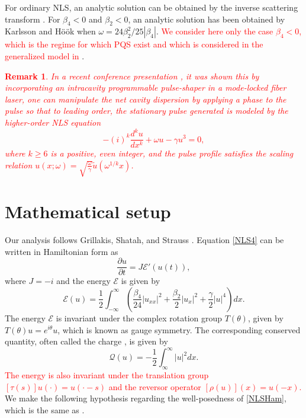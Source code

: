 \documentclass[12pt]{elsarticle}
\def\calE{{\mathcal E}}
\newtheorem{remark}{Remark}
\newcommand{\revised}[1]{ \textcolor{red}{#1} }
\begin{document}
For ordinary NLS, an analytic solution can be obtained by the inverse scattering transform \cite{Zak72}. For $\beta_4 < 0$ and $\beta_2 < 0$, an analytic solution has been obtained by Karlsson and H{\"o}{\"o}k \cite{KarllsonHook} when $\omega = 24 \beta_2^2 / 25 |\beta_4|$. \revised{We consider here only the case $\beta_4 < 0$, which is the regime for which PQS exist \cite{Tam2019} and which is considered in the generalized model in \cite{Tam2020}}.

\revised{
\begin{remark}
In a recent conference presentation \cite{Runge2020}, it was shown this by incorporating an intracavity programmable pulse-shaper in a mode-locked fiber laser, one can manipulate the net cavity dispersion by applying a phase to the pulse so that to leading order, the stationary pulse generated is modeled by the higher-order NLS equation
\begin{equation}\label{HONLS}
-(i)^k\frac{d^k u}{dx^k}+ \omega u - \gamma u^3 = 0,
\end{equation}
where $k \geq 6$ is a positive, even integer, and the pulse profile satisfies the scaling relation $u(x; \omega) = \sqrt{\frac{\omega}{\gamma}}\tilde{u}(\omega^{1/k}x)$.
\end{remark}
}

\section{Mathematical setup}\label{sec:setup}

Our analysis follows Grillakis, Shatah, and Strauss \cite{Grillakis1987}. Equation \cref{NLS4} can be written in Hamiltonian form as 
\begin{equation}\label{NLSHam}
\frac{\partial u}{\partial t} = J \calE'(u(t)),
\end{equation}
where $J = -i$ and the energy $\calE$ is given by
\begin{equation}\label{defH}
\calE(u) = \frac{1}{2} \int_{-\infty}^\infty \left( \frac{\beta_4}{24}|u_{xx}|^2 + \frac{\beta_2}{2}|u_{x}|^2 + \frac{\gamma}{2} |u|^4 \right) dx.
\end{equation}
The energy $\mathcal{E}$ is invariant under the complex rotation group $T(\theta)$, given by $T(\theta)u = e^{i\theta}u$, which is known as gauge symmetry. The corresponding conserved quantity, often called the charge \cite[Section 6.C]{Grillakis1987}, is given by
\begin{equation}\label{defQ}
\mathcal{Q}(u) = -\frac{1}{2} \int_{\infty}^\infty |u|^2 dx.
\end{equation}
\revised{The energy is also invariant under the translation group $[\tau(s)]u(\cdot) = u(\cdot - s)$ and the reversor operator $[\rho(u)](x) = u(-x)$.} We make the following hypothesis regarding the well-posedness of \cref{NLSHam}, which is the same as \cite[Assumption 1]{Grillakis1987}.
\end{document}
